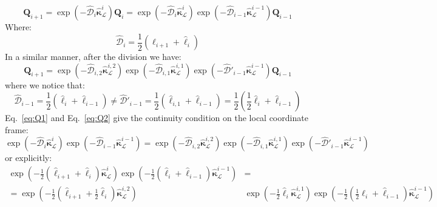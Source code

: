 \documentclass[a4paper, 11pt]{article}
\begin{document}
\begin{equation}\label{eq:Q1}
    \boldsymbol{Q}_{i+1}=\exp\left(-{\hat{\mathcal{D}}_i\hat{\boldsymbol{\kappa}}^i_\mathcal{L}}\right)\boldsymbol{Q}_i=\exp\left(-{\hat{\mathcal{D}}_i\hat{\boldsymbol{\kappa}}^i_\mathcal{L}}\right)\exp\left(-\hat{\mathcal{D}}_{i-1}\hat{\boldsymbol{\kappa}}^{i-1}_\mathcal{L}\right)\boldsymbol{Q}_{i-1}
\end{equation}
Where:
\begin{equation}
    \hat{\mathcal{D}}_i=\frac{1}{2}(\hat{\ell}_{i+1}+\hat{\ell}_{i})
\end{equation}
In a similar manner, after the division we have:
\begin{equation}\label{eq:Q2}
    \boldsymbol{Q}_{i+1}=\exp\left(-\hat{\mathcal{D}}_{i,2}\hat{\boldsymbol{\kappa}}^{i,2}_\mathcal{L}\right)\exp\left(-\hat{\mathcal{D}}_{i,1}\hat{\boldsymbol{\kappa}}^{i,1}_\mathcal{L}\right)\exp\left(-\hat{\mathcal{D}}'_{i-1}\hat{\boldsymbol{\kappa}}^{i-1}_\mathcal{L}\right)\boldsymbol{Q}_{i-1}
\end{equation}
where we notice that:
\begin{equation}
    \hat{\mathcal{D}}_{i-1}=\frac{1}{2}(\hat{\ell}_{i}+\hat{\ell}_{i-1})\neq\hat{\mathcal{D}}'_{i-1}=\frac{1}{2}(\hat{\ell}_{i,1}+\hat{\ell}_{i-1})=\frac{1}{2}(\frac{1}{2}\hat{\ell}_{i}+\hat{\ell}_{i-1})
\end{equation}
Eq.~\ref{eq:Q1} and Eq.~\ref{eq:Q2} give the continuity condition on the local coordinate frame:
\begin{equation}
    \exp\left(-{\hat{\mathcal{D}}_i\hat{\boldsymbol{\kappa}}^i_\mathcal{L}}\right)\exp\left(-\hat{\mathcal{D}}_{i-1}\hat{\boldsymbol{\kappa}}^{i-1}_\mathcal{L}\right)=\exp\left(-\hat{\mathcal{D}}_{i,2}\hat{\boldsymbol{\kappa}}^{i,2}_\mathcal{L}\right)\exp\left(-\hat{\mathcal{D}}_{i,1}\hat{\boldsymbol{\kappa}}^{i,1}_\mathcal{L}\right)\exp\left(-\hat{\mathcal{D}}'_{i-1}\hat{\boldsymbol{\kappa}}^{i-1}_\mathcal{L}\right)
\end{equation}
or explicitly:
\begin{align}\label{eq:Q_f}
    \exp\left(-{\frac{1}{2}(\hat{\ell}_{i+1}+\hat{\ell}_{i})\hat{\boldsymbol{\kappa}}^i_\mathcal{L}}\right)\exp\left(-\frac{1}{2}(\hat{\ell}_{i}+\hat{\ell}_{i-1})\hat{\boldsymbol{\kappa}}^{i-1}_\mathcal{L}\right)&=\nonumber\\
    =\exp\left(-\frac{1}{2}(\hat{\ell}_{i+1}+\frac{1}{2}\hat{\ell}_{i})\hat{\boldsymbol{\kappa}}^{i,2}_\mathcal{L}\right)&\exp\left(-\frac{1}{2}\hat{\ell}_i\hat{\boldsymbol{\kappa}}^{i,1}_\mathcal{L}\right)\exp\left(-\frac{1}{2}(\frac{1}{2}\hat{\ell}_{i}+\hat{\ell}_{i-1})\hat{\boldsymbol{\kappa}}^{i-1}_\mathcal{L}\right)
\end{align}
\end{document}
